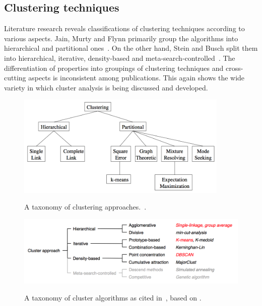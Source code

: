 \subsection{Clustering techniques}

Literature research reveals classifications of clustering techniques according to various aspects. Jain, Murty and Flynn primarily group the algorithms into hierarchical and partitional ones~\cite{Jain99clusterreview}. On the other hand, Stein and Busch split them into hierarchical, iterative, density-based and meta-search-controlled~\cite{Stein05density}. The differentiation of properties into groupings of clustering techniques and cross-cutting aspects is inconsistent among publications. This again shows the wide variety in which cluster analysis is being discussed and developed.

\begin{figure}[h]
  \begin{center}
    \includegraphics[width=0.9\textwidth]{figures/clustering_approaches_jain.png}
    \label{fig:clusters}
    \caption{A taxonomy of clustering approaches.~\cite[p 275]{Jain99clusterreview}.}
  \end{center}
\end{figure}

\begin{figure}[h]
  \begin{center}
    \includegraphics[width=1\textwidth]{figures/clustering_techniques_meert.png}
    \label{fig:clusters}
    \caption{A taxonomy of cluster algorithms as cited in~\cite[p 14]{Meert06clustermaps}, based on \cite{Stein05density}.}
  \end{center}
\end{figure}

